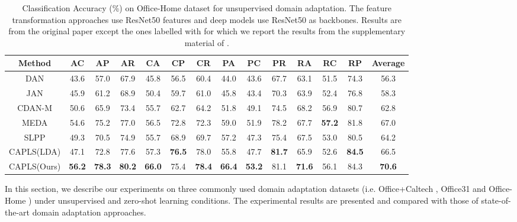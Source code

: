 \documentclass[conference]{IEEEtran}
\begin{document}
\begin{table*}[!htbp]
	\centering
	{\centering
		\caption[]{Classification Accuracy (\%) on Office-Home dataset for unsupervised domain adaptation. The feature transformation approaches use ResNet50 features and deep models use ResNet50 as backbones. Results are from the original paper except the ones labelled with  for which we report the results from the supplementary material of \cite{wang2018visual}.\\	}
		\label{table:uda_o65}
		\begin{lrbox}{\tablebox}
			\begin{tabular}{cccccccccccccc}
				\hline
				Method & AC & AP & AR & CA&CP & CR&PA & PC & PR & RA & RC & RP & Average \\ \hline
				DAN\cite{long2015learning}  & 43.6 & 57.0 & 67.9 & 45.8 & 56.5 & 60.4 & 44.0 & 43.6 & 67.7 & 63.1 & 51.5 & 74.3 & 56.3\\
				JAN\cite{long2017deep} & 45.9 & 61.2 & 68.9 & 50.4 & 59.7 & 61.0 & 45.8 & 43.4 & 70.3 & 63.9 & 52.4 & 76.8 & 58.3\\
				CDAN-M\cite{long2018conditional} & 50.6 & 65.9 & 73.4 & 55.7 & 62.7 & 64.2 & 51.8 & 49.1 & 74.5 & 68.2 & 56.9 & 80.7 & 62.8\\
				\hline
				MEDA\cite{wang2018visual} & 54.6 & 75.2 & 77.0 & 56.5 & 72.8 & 72.3 & 59.0 & 51.9 & 78.2 & 67.7 & \textbf{57.2} & 81.8 & 67.0\\
				SLPP & 49.3 & 70.5 & 74.9 & 55.7 & 68.9 & 69.7 & 57.2 & 47.3 & 75.4 & 67.5 & 53.0 & 80.5 & 64.2\\
CAPLS(LDA) &47.1 & 72.8 & 77.6 & 57.3 & \textbf{76.5} & 78.0 & 55.8 & 47.7 & \textbf{81.7} & 65.9 & 52.6 & \textbf{84.5} & 66.5\\ \hline
				CAPLS(Ours) & \textbf{56.2} & \textbf{78.3} & \textbf{80.2} & \textbf{66.0} & 75.4 & \textbf{78.4} & \textbf{66.4} & \textbf{53.2} & 81.1 & \textbf{71.6} & 56.1 & 84.3 & \textbf{70.6}\\
				\hline
				\hline
			\end{tabular}
		\end{lrbox}
		\scalebox{0.85}{\usebox{\tablebox}}
	}
\end{table*}

In this section, we describe our experiments on three commonly used domain adaptation datasets (i.e. Office+Caltech \cite{gong2012geodesic}, Office31 \cite{saenko2010adapting} and Office-Home \cite{venkateswara2017deep}) under unsupervised and zero-shot learning conditions. The experimental results are presented and compared with those of state-of-the-art domain adaptation approaches.
\end{document}
